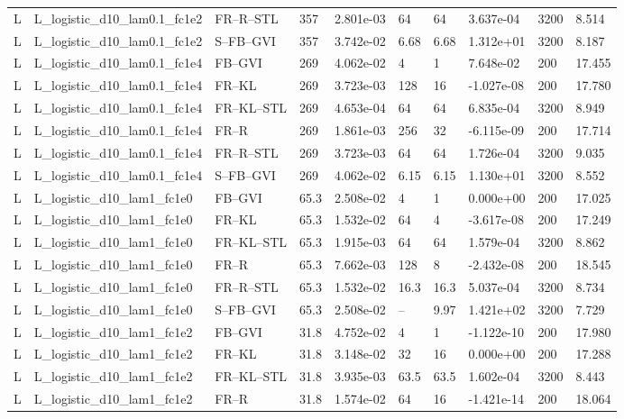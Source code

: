 \begin{tabular}{llllllllll}
L & L\_logistic\_d10\_lam0.1\_fc1e2 & FR--R--STL & 357 & 2.801e-03 & 64 & 64 & 3.637e-04 & 3200 & 8.514 \\
L & L\_logistic\_d10\_lam0.1\_fc1e2 & S--FB--GVI & 357 & 3.742e-02 & 6.68 & 6.68 & 1.312e+01 & 3200 & 8.187 \\
L & L\_logistic\_d10\_lam0.1\_fc1e4 & FB--GVI & 269 & 4.062e-02 & 4 & 1 & 7.648e-02 & 200 & 17.455 \\
L & L\_logistic\_d10\_lam0.1\_fc1e4 & FR--KL & 269 & 3.723e-03 & 128 & 16 & -1.027e-08 & 200 & 17.780 \\
L & L\_logistic\_d10\_lam0.1\_fc1e4 & FR--KL--STL & 269 & 4.653e-04 & 64 & 64 & 6.835e-04 & 3200 & 8.949 \\
L & L\_logistic\_d10\_lam0.1\_fc1e4 & FR--R & 269 & 1.861e-03 & 256 & 32 & -6.115e-09 & 200 & 17.714 \\
L & L\_logistic\_d10\_lam0.1\_fc1e4 & FR--R--STL & 269 & 3.723e-03 & 64 & 64 & 1.726e-04 & 3200 & 9.035 \\
L & L\_logistic\_d10\_lam0.1\_fc1e4 & S--FB--GVI & 269 & 4.062e-02 & 6.15 & 6.15 & 1.130e+01 & 3200 & 8.552 \\
L & L\_logistic\_d10\_lam1\_fc1e0 & FB--GVI & 65.3 & 2.508e-02 & 4 & 1 & 0.000e+00 & 200 & 17.025 \\
L & L\_logistic\_d10\_lam1\_fc1e0 & FR--KL & 65.3 & 1.532e-02 & 64 & 4 & -3.617e-08 & 200 & 17.249 \\
L & L\_logistic\_d10\_lam1\_fc1e0 & FR--KL--STL & 65.3 & 1.915e-03 & 64 & 64 & 1.579e-04 & 3200 & 8.862 \\
L & L\_logistic\_d10\_lam1\_fc1e0 & FR--R & 65.3 & 7.662e-03 & 128 & 8 & -2.432e-08 & 200 & 18.545 \\
L & L\_logistic\_d10\_lam1\_fc1e0 & FR--R--STL & 65.3 & 1.532e-02 & 16.3 & 16.3 & 5.037e-04 & 3200 & 8.734 \\
L & L\_logistic\_d10\_lam1\_fc1e0 & S--FB--GVI & 65.3 & 2.508e-02 & -- & 9.97 & 1.421e+02 & 3200 & 7.729 \\
L & L\_logistic\_d10\_lam1\_fc1e2 & FB--GVI & 31.8 & 4.752e-02 & 4 & 1 & -1.122e-10 & 200 & 17.980 \\
L & L\_logistic\_d10\_lam1\_fc1e2 & FR--KL & 31.8 & 3.148e-02 & 32 & 16 & 0.000e+00 & 200 & 17.288 \\
L & L\_logistic\_d10\_lam1\_fc1e2 & FR--KL--STL & 31.8 & 3.935e-03 & 63.5 & 63.5 & 1.602e-04 & 3200 & 8.443 \\
L & L\_logistic\_d10\_lam1\_fc1e2 & FR--R & 31.8 & 1.574e-02 & 64 & 16 & -1.421e-14 & 200 & 18.064 \\

\end{tabular}

